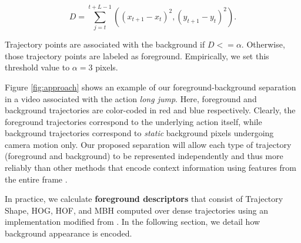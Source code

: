 
\begin{equation}
D = \sum _{j=t}^{t+L-1}\left ( (x_{t+1}-x_t)^2, (y_{t+1}-y_t)^2 \right ).
\end{equation}

Trajectory points are associated with the background if $D<=\alpha$. Otherwise, those trajectory points are labeled as foreground. Empirically, we set this threshold value to $\alpha=3$ pixels.

Figure \ref{fig:approach} shows an example of our foreground-background separation in a video associated with the action \textit{long jump}. Here, foreground and background trajectories are color-coded in red and blue respectively. Clearly, the foreground trajectories correspond to the underlying action itself, while background trajectories correspond to \emph{static} background pixels undergoing camera motion only. Our proposed separation will allow each type of trajectory (foreground and background) to be represented independently and thus more reliably than other methods that encode context information using features from the entire frame \cite{marszalek2009}.

In practice, we calculate \textbf{foreground descriptors} that consist of Trajectory Shape, HOG, HOF, and MBH computed over dense trajectories using an implementation modified from \cite{wang2013}. In the following section, we detail how background appearance is encoded.


